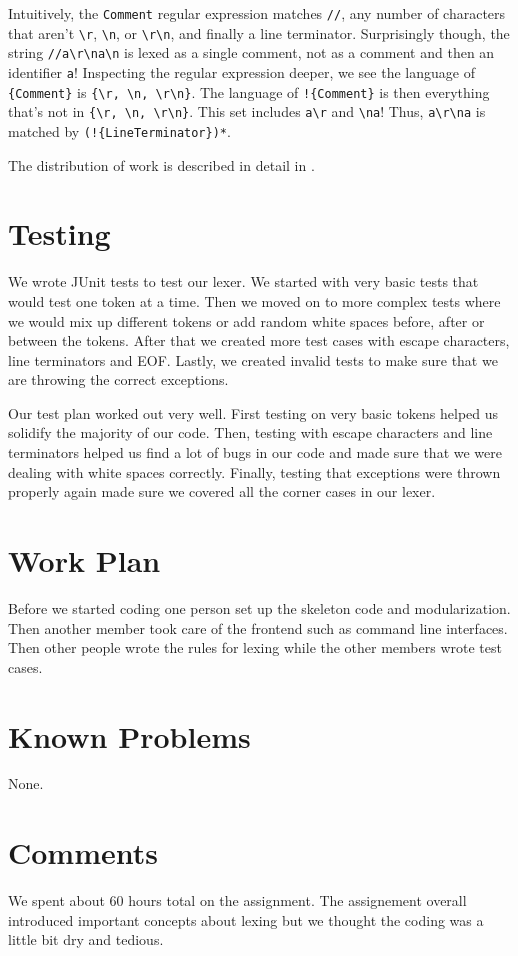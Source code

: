 \documentclass{hw}
\begin{document}
Intuitively, the \texttt{Comment} regular expression matches \texttt{//}, any
number of characters that aren't \verb$\r$, \verb$\n$, or \verb$\r\n$, and
finally a line terminator. Surprisingly though, the string \verb$//a\r\na\n$ is
lexed as a single comment, not as a comment and then an identifier \verb$a$!
Inspecting the regular expression deeper, we see the language of
\verb${Comment}$ is \verb${\r, \n, \r\n}$. The language of \verb$!{Comment}$ is
then everything that's not in \verb${\r, \n, \r\n}$. This set includes
\verb$a\r$ and \verb$\na$! Thus, \verb$a\r\na$ is matched by
\verb$(!{LineTerminator})*$.

The distribution of work is described in detail in .

\section{Testing}\label{sec:testing}
We wrote JUnit tests to test our lexer. We started with very basic tests that 
would test one token at a time. Then we moved on to more complex tests where 
we would mix up different tokens or add random white spaces before, after or between the 
tokens. After that we created more test cases with escape characters, line terminators
and EOF. Lastly, we created invalid tests to make sure that we are throwing the correct
exceptions.

Our test plan worked out very well. First testing on very basic tokens helped us solidify
the majority of our code. Then, testing with escape characters and line terminators helped 
us find a lot of bugs in our code and made sure that we were dealing with white spaces correctly.
Finally, testing that exceptions were thrown properly again made sure we covered all the corner
cases in our lexer. 
\section{Work Plan}\label{sec:workplan}
Before we started coding one person set up the skeleton code and modularization. Then another 
member took care of the frontend such as command line interfaces. Then other people 
wrote the rules for lexing while the other members wrote test cases.  
\section{Known Problems}\label{sec:problems}
None.
\section{Comments}\label{sec:comments}
We spent about 60 hours total on the assignment. The assignement overall introduced
important concepts about lexing but we thought the coding was a little bit dry and tedious.
\end{document}
